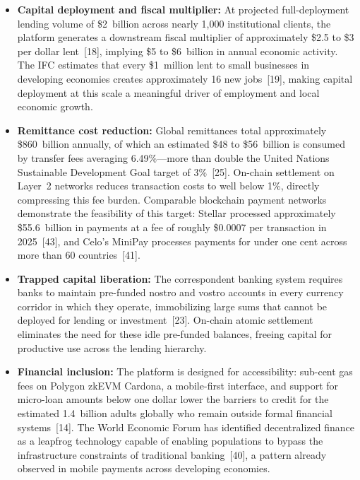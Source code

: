 \documentclass[12pt,a4paper]{report}
\begin{document}
\begin{itemize}[noitemsep]
\item \textbf{Capital deployment and fiscal multiplier:} At projected full-deployment lending volume of \$2~billion across nearly 1,000 institutional clients, the platform generates a downstream fiscal multiplier of approximately \$2.5 to \$3 per dollar lent~[18], implying \$5 to \$6~billion in annual economic activity. The IFC estimates that every \$1~million lent to small businesses in developing economies creates approximately 16 new jobs~[19], making capital deployment at this scale a meaningful driver of employment and local economic growth.

\item \textbf{Remittance cost reduction:} Global remittances total approximately \$860~billion annually, of which an estimated \$48 to \$56~billion is consumed by transfer fees averaging 6.49\%---more than double the United Nations Sustainable Development Goal target of 3\%~[25]. On-chain settlement on Layer~2 networks reduces transaction costs to well below 1\%, directly compressing this fee burden. Comparable blockchain payment networks demonstrate the feasibility of this target: Stellar processed approximately \$55.6~billion in payments at a fee of roughly \$0.0007 per transaction in 2025~[43], and Celo's MiniPay processes payments for under one cent across more than 60 countries~[41].

\item \textbf{Trapped capital liberation:} The correspondent banking system requires banks to maintain pre-funded nostro and vostro accounts in every currency corridor in which they operate, immobilizing large sums that cannot be deployed for lending or investment~[23]. On-chain atomic settlement eliminates the need for these idle pre-funded balances, freeing capital for productive use across the lending hierarchy.

\item \textbf{Financial inclusion:} The platform is designed for accessibility: sub-cent gas fees on Polygon zkEVM Cardona, a mobile-first interface, and support for micro-loan amounts below one dollar lower the barriers to credit for the estimated 1.4~billion adults globally who remain outside formal financial systems~[14]. The World Economic Forum has identified decentralized finance as a leapfrog technology capable of enabling populations to bypass the infrastructure constraints of traditional banking~[40], a pattern already observed in mobile payments across developing economies.


\end{itemize}
\end{document}
